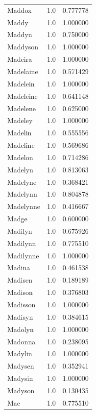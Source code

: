 \documentclass[
  letterpaper,
  DIV=11,
  numbers=noendperiod]{scrreprt}
\begin{document}
\begin{tabular}{lrr}
Maddox          &   1.0 &   0.777778 \\
Maddy           &   1.0 &   1.000000 \\
Maddyn          &   1.0 &   0.750000 \\
Maddyson        &   1.0 &   1.000000 \\
Madeira         &   1.0 &   1.000000 \\
Madelaine       &   1.0 &   0.571429 \\
Madelein        &   1.0 &   1.000000 \\
Madeleine       &   1.0 &   0.641148 \\
Madelene        &   1.0 &   0.625000 \\
Madeley         &   1.0 &   1.000000 \\
Madelin         &   1.0 &   0.555556 \\
Madeline        &   1.0 &   0.569686 \\
Madelon         &   1.0 &   0.714286 \\
Madelyn         &   1.0 &   0.813063 \\
Madelyne        &   1.0 &   0.368421 \\
Madelynn        &   1.0 &   0.804878 \\
Madelynne       &   1.0 &   0.416667 \\
Madge           &   1.0 &   0.600000 \\
Madilyn         &   1.0 &   0.675926 \\
Madilynn        &   1.0 &   0.775510 \\
Madilynne       &   1.0 &   1.000000 \\
Madina          &   1.0 &   0.461538 \\
Madisen         &   1.0 &   0.189189 \\
Madison         &   1.0 &   0.376803 \\
Madisson        &   1.0 &   1.000000 \\
Madisyn         &   1.0 &   0.384615 \\
Madolyn         &   1.0 &   1.000000 \\
Madonna         &   1.0 &   0.238095 \\
Madylin         &   1.0 &   1.000000 \\
Madysen         &   1.0 &   0.352941 \\
Madysin         &   1.0 &   1.000000 \\
Madyson         &   1.0 &   0.130435 \\
Mae             &   1.0 &   0.775510 \\

\end{tabular}
\end{document}
